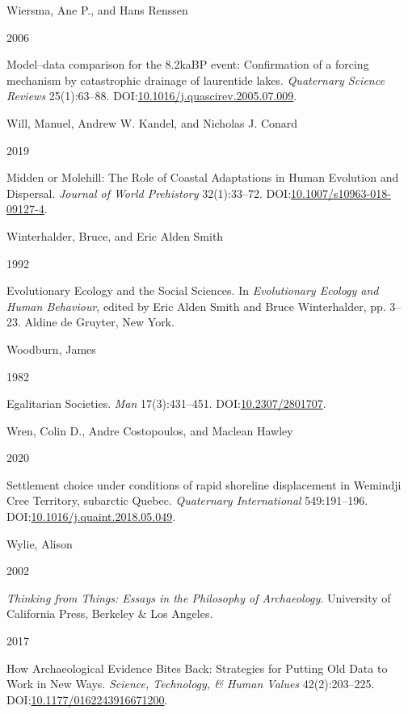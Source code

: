 \documentclass[
  12pt,
  a4paper,
  oneside]{book}
\newlength{\cslhangindent}
\newlength{\csllabelwidth}
\newlength{\cslentryspacingunit} %
\newenvironment{CSLReferences}[2] %
 {%
  \setlength{\parindent}{0pt}
  \ifodd #1
  \let\oldpar\par
  \def\par{\hangindent=\cslhangindent\oldpar}
  \fi
  \setlength{\parskip}{#2\cslentryspacingunit}
 }%
 {}
\newcommand{\CSLBlock}[1]{#1\hfill\break}
\newcommand{\CSLLeftMargin}[1]{\parbox[t]{\csllabelwidth}{#1}}
\newcommand{\CSLRightInline}[1]{\parbox[t]{\linewidth - \csllabelwidth}{#1}\break}
\begin{document}
\begin{CSLReferences}{0}{0}
\leavevmode{}%
\CSLBlock{Wiersma, Ane P., and Hans Renssen}
\CSLLeftMargin{ 2006}%
\CSLRightInline{Model--data comparison for the 8.2kaBP event: Confirmation of a forcing mechanism by catastrophic drainage of laurentide lakes. \emph{Quaternary Science Reviews} 25(1):63--88. DOI:\href{https://doi.org/10.1016/j.quascirev.2005.07.009}{10.1016/j.quascirev.2005.07.009}.}

\leavevmode{}%
\CSLBlock{Will, Manuel, Andrew W. Kandel, and Nicholas J. Conard}
\CSLLeftMargin{ 2019}%
\CSLRightInline{Midden or Molehill: The Role of Coastal Adaptations in Human Evolution and Dispersal. \emph{Journal of World Prehistory} 32(1):33--72. DOI:\href{https://doi.org/10.1007/s10963-018-09127-4}{10.1007/s10963-018-09127-4}.}

\leavevmode{}%
\CSLBlock{Winterhalder, Bruce, and Eric Alden Smith}
\CSLLeftMargin{ 1992}%
\CSLRightInline{{Evolutionary Ecology and the Social Sciences}. In \emph{{Evolutionary Ecology and Human Behaviour}}, edited by Eric Alden Smith and Bruce Winterhalder, pp. 3--23. Aldine de Gruyter, New York.}

\leavevmode{}%
\CSLBlock{Woodburn, James}
\CSLLeftMargin{ 1982}%
\CSLRightInline{{Egalitarian Societies}. \emph{Man} 17(3):431--451. DOI:\href{https://doi.org/10.2307/2801707}{10.2307/2801707}.}

\leavevmode{}%
\CSLBlock{Wren, Colin D., Andre Costopoulos, and Maclean Hawley}
\CSLLeftMargin{ 2020}%
\CSLRightInline{{Settlement choice under conditions of rapid shoreline displacement in Wemindji Cree Territory, subarctic Quebec}. \emph{Quaternary International} 549:191--196. DOI:\href{https://doi.org/10.1016/j.quaint.2018.05.049}{10.1016/j.quaint.2018.05.049}.}

\leavevmode{}%
\CSLBlock{Wylie, Alison}
\CSLLeftMargin{ 2002}%
\CSLRightInline{\emph{{Thinking from Things: Essays in the Philosophy of Archaeology}}. University of California Press, Berkeley \& Los Angeles.}

\leavevmode{}%
\CSLLeftMargin{ 2017 }%
\CSLRightInline{{How Archaeological Evidence Bites Back: Strategies for Putting Old Data to Work in New Ways}. \emph{Science, Technology, \& Human Values} 42(2):203--225. DOI:\href{https://doi.org/10.1177/0162243916671200}{10.1177/0162243916671200}.}


\end{CSLReferences}
\end{document}
